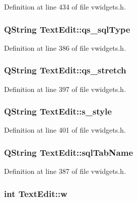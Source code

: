 Definition at line 434 of file vwidgets.h.

\hypertarget{classTextEdit_afd36a05b3b17d867962ac4f6fb35ef34}{
\subsubsection[{qs\_\-sqlType}]{\setlength{\rightskip}{0pt plus 5cm}QString {\bf TextEdit::qs\_\-sqlType}}}
\label{classTextEdit_afd36a05b3b17d867962ac4f6fb35ef34}


Definition at line 386 of file vwidgets.h.

\hypertarget{classTextEdit_ab0ce9d289269262659caac4e5a3083b7}{
\subsubsection[{qs\_\-stretch}]{\setlength{\rightskip}{0pt plus 5cm}QString {\bf TextEdit::qs\_\-stretch}}}
\label{classTextEdit_ab0ce9d289269262659caac4e5a3083b7}


Definition at line 397 of file vwidgets.h.

\hypertarget{classTextEdit_a13f16a0f85b59391e8b4ab3928f78f7d}{
\subsubsection[{s\_\-style}]{\setlength{\rightskip}{0pt plus 5cm}QString {\bf TextEdit::s\_\-style}}}
\label{classTextEdit_a13f16a0f85b59391e8b4ab3928f78f7d}


Definition at line 401 of file vwidgets.h.

\hypertarget{classTextEdit_af5c9b9e3cb3f368c7d19e4bf5fecc37a}{
\subsubsection[{sqlTabName}]{\setlength{\rightskip}{0pt plus 5cm}QString {\bf TextEdit::sqlTabName}}}
\label{classTextEdit_af5c9b9e3cb3f368c7d19e4bf5fecc37a}


Definition at line 387 of file vwidgets.h.

\hypertarget{classTextEdit_a5f3dbfec116053d6257ab51a85411a21}{
\subsubsection[{w}]{\setlength{\rightskip}{0pt plus 5cm}int {\bf TextEdit::w}}}
\label{classTextEdit_a5f3dbfec116053d6257ab51a85411a21}


